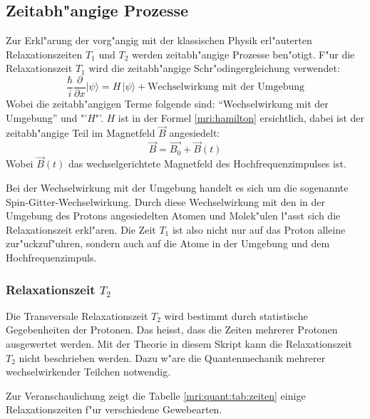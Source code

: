\subsection{Zeitabh"angige Prozesse}
%
%
%
Zur Erkl"arung der vorg"angig mit der klassischen Physik erl"auterten Relaxationszeiten $T_1$ und $T_2$ werden zeitabh"angige Prozesse ben"otigt. F"ur die Relaxationszeit $T_1$ wird die zeitabh"angige Schr"odingergleichung verwendet:
\begin{equation}
\frac{\hbar}{i} \frac{\partial}{\partial x} |\psi\rangle = H\,|\psi\rangle + \text{Wechselwirkung mit der Umgebung}
\end{equation}
Wobei die zeitabh"angigen Terme folgende sind: "`Wechselwirkung mit der Umgebung"' und "'$H$"'. 
$H$ ist in der Formel \ref{mri:hamilton} ersichtlich, dabei ist der zeitabh"angige Teil im Magnetfeld $\vec{B}$ angesiedelt:
\begin{equation}
\vec{B} = \vec{B_0} + \vec{B}(t)
\end{equation}
Wobei $\vec{B}(t)$ das wechselgerichtete Magnetfeld des Hochfrequenzimpulses ist.

Bei der Wechselwirkung mit der Umgebung handelt es sich um die sogenannte Spin-Gitter-Wechselwirkung. Durch diese Wechselwirkung mit den in der Umgebung des Protons angesiedelten Atomen und Molek"ulen l"asst sich die Relaxationszeit erkl"aren. Die Zeit $T_1$ ist also nicht nur auf das Proton alleine zur"uckzuf"uhren, sondern auch auf die Atome in der Umgebung und dem Hochfrequenzimpuls.
%

\subsubsection{Relaxationszeit $T_2$}
Die Transversale  Relaxationszeit $T_2$ wird bestimmt durch statistische Gegebenheiten der Protonen. Das heisst, dass die Zeiten mehrerer Protonen ausgewertet werden. Mit der Theorie in diesem Skript kann die Relaxationszeit $T_2$ nicht beschrieben werden. Dazu w"are die Quantenmechanik mehrerer wechselwirkender Teilchen notwendig. 

Zur Veranschaulichung zeigt die Tabelle \ref{mri:quant:tab:zeiten} einige Relaxationszeiten f"ur verschiedene Gewebearten.

